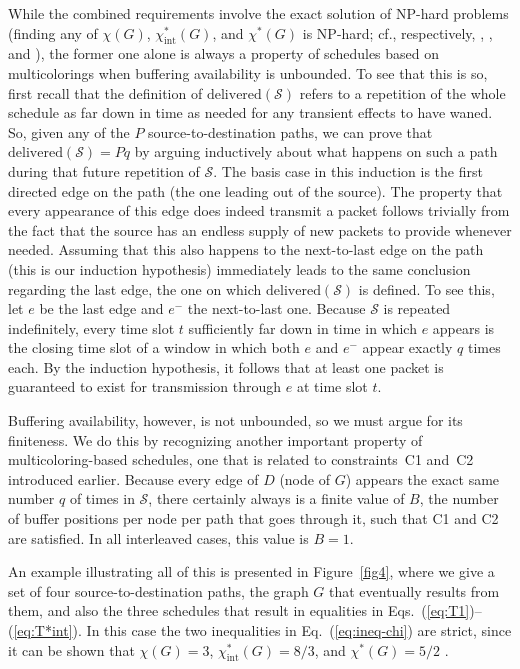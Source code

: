 \documentclass{article}
\begin{document}
While the combined requirements involve the exact solution of NP-hard problems
(finding any of $\chi(G)$, $\chi^*_\mathrm{int}(G)$, and $\chi^*(G)$ is
NP-hard; cf., respectively, \cite{k72}, \cite{bg89}, and \cite{gls81}), the
former one alone is always a property of schedules based on multicolorings when
buffering availability is unbounded. To see that this is so, first recall that
the definition of $\mathrm{delivered}(\mathcal{S})$ refers to a repetition of
the whole schedule as far down in time as needed for any transient effects to
have waned. So, given any of the $P$ source-to-destination paths, we can prove
that $\mathrm{delivered}(\mathcal{S})=Pq$ by arguing inductively about what
happens on such a path during that future repetition of $\mathcal{S}$. The basis
case in this induction is the first directed edge on the path (the one leading
out of the source). The property that every appearance of this edge does indeed
transmit a packet follows trivially from the fact that the source has an endless
supply of new packets to provide whenever needed. Assuming that this also
happens to the next-to-last edge on the path (this is our induction hypothesis)
immediately leads to the same conclusion regarding the last edge, the one on
which $\mathrm{delivered}(\mathcal{S})$ is defined. To see this, let $e$ be the
last edge and $e^-$ the next-to-last one. Because $\mathcal{S}$ is repeated
indefinitely, every time slot $t$ sufficiently far down in time in which $e$
appears is the closing time slot of a window in which both $e$ and $e^-$ appear
exactly $q$ times each. By the induction hypothesis, it follows that at least
one packet is guaranteed to exist for transmission through $e$ at time slot $t$.

Buffering availability, however, is not unbounded, so we must argue for its
finiteness. We do this by recognizing another important property of
multicoloring-based schedules, one that is related to constraints~C1 and~C2
introduced earlier. Because every edge of $D$ (node of $G$) appears the exact
same number $q$ of times in $\mathcal{S}$, there certainly always is a finite
value of $B$, the number of buffer positions per node per path that goes through
it, such that C1 and C2 are satisfied. In all interleaved cases, this value is
$B=1$.

An example illustrating all of this is presented in Figure~\ref{fig4}, where we
give a set of four source-to-destination paths, the graph $G$ that eventually
results from them, and also the three schedules that result in equalities in
Eqs.~(\ref{eq:T1})--(\ref{eq:T*int}). In this case the two inequalities in
Eq.~(\ref{eq:ineq-chi}) are strict, since it can be shown that
$\chi(G)=3$, $\chi^*_\mathrm{int}(G)=8/3$, and $\chi^*(G)=5/2$ \cite{s76,bg89}. 
\end{document}
